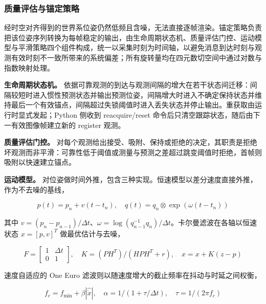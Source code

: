 \documentclass[review]{vgtc}
\begin{document}
\subsubsection{质量评估与锚定策略}\label{sec:policy}


经时空对齐得到的世界系位姿仍然低频且含噪，无法直接逐帧渲染。锚定策略负责把该位姿序列转换为每帧稳定的输出，由生命周期状态机、质量评估门控、运动模型与平滑策略四个组件构成，统一以采集时刻为时间轴，以避免消息到达时刻与观测有效时刻不一致所带来的系统偏差；所有旋转量均在四元数切空间中通过对数与指数映射处理。

\textbf{生命周期状态机。} 依据可靠观测的到达与观测间隔的增大在若干状态间迁移：间隔较短时进入惯性预测状态并输出预测位姿，间隔增大时进入不确定保持状态并维持最后一个有效锚点，间隔超过失锁阈值时进入丢失状态并停止输出。重获取由运行时显式发起；Python 侧收到 reacquire/reset 命令后只清空跟踪状态，随后由下一有效图像帧建立新的 register 观测。

\textbf{质量评估门控。} 对每个观测给出接受、吸附、保持或拒绝的决定，其职责是拒绝坏观测而非平滑：可靠性低于阈值或测量与预测之差超过跳变阈值时拒绝，首帧则吸附以快速建立锚点。

\textbf{运动模型。} 对位姿做时间外推，包含三种实现。恒速模型以差分速度直接外推，作为不去噪的基线，

\begin{equation}
p(t) = p_n + v (t - t_n), \quad q(t) = q_n \otimes \exp\!\left(\omega (t - t_n)\right)
\label{eq:cv}
\end{equation}


其中 $v = (p_n - p_{n - 1}) / \Delta t$、$\omega = \log\!\left(q_{n - 1}^{-1} q_n\right) / \Delta t$。卡尔曼滤波在各轴以恒速状态 $x = [p, v]^T$ 做最优估计与去噪，

\begin{equation}
F = \begin{bmatrix}1 & \Delta t \\ 0 & 1\end{bmatrix}, \quad K = (P H^T) / (H P H^T + r), \quad x = x + K (z - p)
\label{eq:kalman}
\end{equation}


速度自适应的 One Euro 滤波则以随速度增大的截止频率在抖动与时延之间权衡，

\begin{equation}
f_c = f_{\mathrm{min}} + \beta \left\lvert \widehat{\dot{x}}\right \rvert, \quad \alpha = 1 / (1 + \tau / \Delta t), \quad \tau = 1 / (2 \pi f_c)
\label{eq:oneeuro}
\end{equation}
\end{document}
